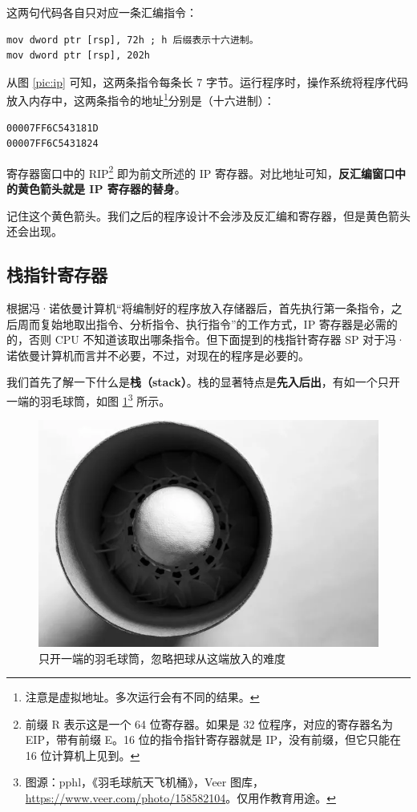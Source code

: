 这两句代码各自只对应一条汇编指令：

\begin{lstlisting}[language=assembly, numbers=none]
mov dword ptr [rsp], 72h ; h 后缀表示十六进制。
mov dword ptr [rsp], 202h
\end{lstlisting}

从图 \ref{pic:ip} 可知，这两条指令每条长 7 字节。运行程序时，操作系统将程序代码放入内存中，这两条指令的地址\footnote{注意是虚拟地址。多次运行会有不同的结果。}分别是（十六进制）：

\begin{lstlisting}[language={}, numbers=none]
00007FF6C543181D
00007FF6C5431824
\end{lstlisting}

寄存器窗口中的 RIP\footnote{前缀 R 表示这是一个 64 位寄存器。如果是 32 位程序，对应的寄存器名为 EIP，带有前缀 E。16 位的指令指针寄存器就是 IP，没有前缀，但它只能在 16 位计算机上见到。} 即为前文所述的 IP 寄存器。对比地址可知，\textbf{反汇编窗口中的黄色箭头就是 IP 寄存器的替身}。

\begin{note}
	记住这个黄色箭头。我们之后的程序设计不会涉及反汇编和寄存器，但是黄色箭头还会出现。
\end{note}

\subsection{栈指针寄存器}

根据冯·诺依曼计算机“将编制好的程序放入存储器后，首先执行第一条指令，之后周而复始地取出指令、分析指令、执行指令”的工作方式，IP 寄存器是必需的的，否则 CPU 不知道该取出哪条指令。但下面提到的栈指针寄存器 SP 对于冯·诺依曼计算机而言并不必要，不过，对现在的程序是必要的。

我们首先了解一下什么是\textbf{栈（stack）}。栈的显著特点是\textbf{先入后出}，有如一个只开一端的羽毛球筒，如图 \ref{pic:badminton}\footnote{图源：pphl，《羽毛球航天飞机桶》，Veer 图库，\url{https://www.veer.com/photo/158582104}。仅用作教育用途。} 所示。

\begin{figure}[H]
	\centering
	\includegraphics[width=0.4\linewidth]{pic/badminton.png}
	\caption{只开一端的羽毛球筒，忽略把球从这端放入的难度}
	\label{pic:badminton}
\end{figure}

